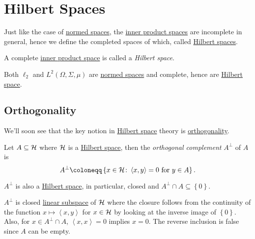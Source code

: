 \section{Hilbert Spaces}
Just like the case of \hyperref[def:normed-vector-space]{normed spaces}, the \hyperref[def:inner-product-space]{inner product spaces} are incomplete in general, hence we define the completed spaces of which, called \hyperref[def:Hilbert-space]{Hilbert spaces}.
\begin{definition}\label{def:Hilbert-space}
	A complete \hyperref[def:inner-product-space]{inner product space} is called a \emph{Hilbert space}.
\end{definition}

\begin{eg}
	Both \(\ell _2\) and \(L^2(\Omega , \Sigma , \mu )\) are \hyperref[def:normed-vector-space]{normed spaces} and complete, hence are \hyperref[def:Hilbert-space]{Hilbert space}.
\end{eg}

\subsection{Orthogonality}
We'll soon see that the key notion in \hyperref[def:Hilbert-space]{Hilbert space} theory is \hyperref[def:orthogonal]{orthogonality}.
\begin{definition}\label{def:orthogonal-complement}
	Let \(A \subseteq \mathcal{\MakeUppercase{h}} \) where \(\mathcal{\MakeUppercase{h}}\) is a \hyperref[def:Hilbert-space]{Hilbert space}, then the \emph{orthogonal complement} \(A^\perp\) of \(A\) is
	\[
		A^\perp \coloneqq \left\{ x\in \mathcal{\MakeUppercase{h}} \colon \left\langle x, y \right\rangle = 0 \text{ for } y\in A \right\}.
	\]
\end{definition}

\begin{remark}
	\(A^\perp\) is also a \hyperref[def:Hilbert-space]{Hilbert space}, in particular, closed and \(A^\perp \cap A \subseteq \left\{ 0 \right\} \).
\end{remark}
\begin{explanation}
	\(A^\perp\) is closed \hyperref[def:linear-vector-space]{linear subspace} of \(\mathcal{\MakeUppercase{h}} \) where the closure follows from the continuity of the function \(x\mapsto \left\langle x, y \right\rangle \) for \(x\in \mathcal{\MakeUppercase{h}} \) by looking at the inverse image of \(\left\{ 0 \right\}\). Also, for \(x\in A^\perp \cap A\), \(\left\langle x, x \right\rangle = 0\) implies \(x = 0\). The reverse inclusion is false since \(A\) can be empty.
\end{explanation}

